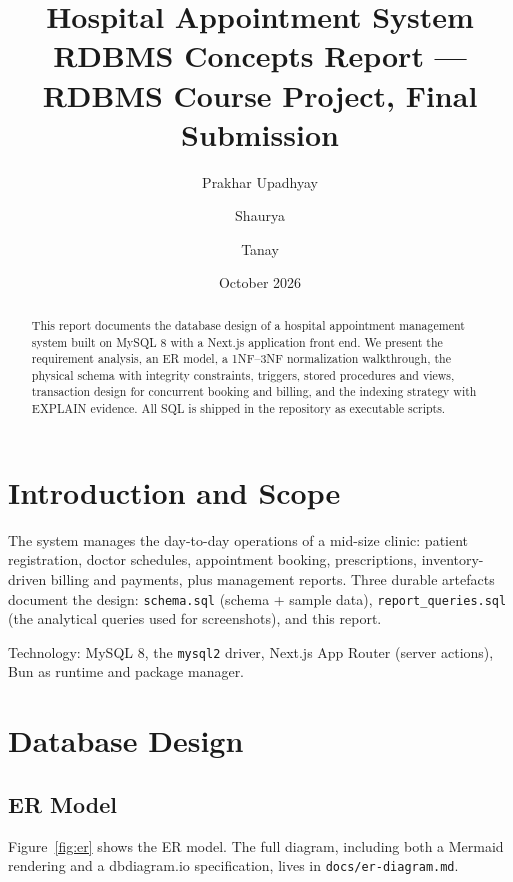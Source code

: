 \documentclass[11pt]{article}
\title{Hospital Appointment System\\
\large RDBMS Concepts Report --- RDBMS Course Project, Final Submission}
\author{Prakhar Upadhyay \and Shaurya \and Tanay}
\date{October 2026}
\begin{document}
\maketitle

\begin{abstract}
This report documents the database design of a hospital appointment
management system built on MySQL 8 with a Next.js application front end.
We present the requirement analysis, an ER model, a 1NF--3NF normalization
walkthrough, the physical schema with integrity constraints, triggers,
stored procedures and views, transaction design for concurrent booking and
billing, and the indexing strategy with EXPLAIN evidence. All SQL is shipped
in the repository as executable scripts.
\end{abstract}

\tableofcontents

\section{Introduction and Scope}
The system manages the day-to-day operations of a mid-size clinic: patient
registration, doctor schedules, appointment booking, prescriptions,
inventory-driven billing and payments, plus management reports.
Three durable artefacts document the design: \texttt{schema.sql}
(schema + sample data), \texttt{report\_queries.sql} (the analytical
queries used for screenshots), and this report.

Technology: MySQL 8, the \texttt{mysql2} driver, Next.js App Router
(server actions), Bun as runtime and package manager.

\section{Database Design}

\subsection{ER Model}
Figure~\ref{fig:er} shows the ER model. The full diagram, including both a
Mermaid rendering and a dbdiagram.io specification, lives in
\texttt{docs/er-diagram.md}.
\end{document}
